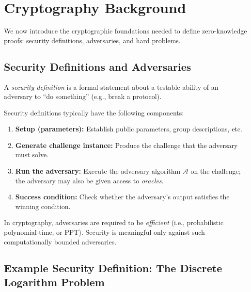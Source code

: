\documentclass[11pt]{article}
\begin{document}
\section{Cryptography Background}

We now introduce the cryptographic foundations needed to define zero-knowledge proofs:
security definitions, adversaries, and hard problems.

\subsection{Security Definitions and Adversaries}

\begin{tcolorbox}[colback=blue!5!white, colframe=blue!50!black,
  title=What is a Security Definition?]
A \emph{security definition} is a formal statement about a testable ability of an adversary
to ``do something'' (e.g., break a protocol).
\end{tcolorbox}

Security definitions typically have the following components:

\begin{enumerate}[leftmargin=2em]
  \item \textbf{Setup (parameters):} Establish public parameters, group descriptions, etc.
  \item \textbf{Generate challenge instance:} Produce the challenge that the adversary must
        solve.
  \item \textbf{Run the adversary:} Execute the adversary algorithm $\mathcal{A}$ on the
        challenge; the adversary may also be given access to \emph{oracles}.
  \item \textbf{Success condition:} Check whether the adversary's output satisfies the
        winning condition.
\end{enumerate}

\begin{remark}
In cryptography, adversaries are required to be \emph{efficient} (i.e., probabilistic
polynomial-time, or PPT).  Security is meaningful only against such computationally
bounded adversaries.
\end{remark}

\subsection{Example Security Definition: The Discrete Logarithm Problem}
\end{document}
